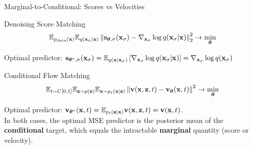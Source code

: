 \documentclass{beamer}
\begin{document}
\begin{frame}{Marginal-to-Conditional: Scores vs Velocities}
	\begin{block}{Denoising Score Matching}
		\vspace{-0.3cm}
		\[
			\mathbb{E}_{p_{\text{data}}(\mathbf{x})} \mathbb{E}_{q(\mathbf{x}_{\sigma} | \mathbf{x})}\left\| \mathbf{s}_{\boldsymbol{\theta}, \sigma}(\mathbf{x}_{\sigma}) - \nabla_{\mathbf{x}_{\sigma}} \log q(\mathbf{x}_{\sigma} | \mathbf{x}) \right\|_2^2 \rightarrow \min_{\boldsymbol{\theta}}
		\]
		\vspace{-0.3cm}
	\end{block}
	Optimal predictor: $\mathbf{s}_{\boldsymbol{\theta}^*, \sigma}(\mathbf{x}_\sigma) = \mathbb{E}_{q(\mathbf{x} | \mathbf{x}_\sigma)} \left[\nabla_{\mathbf{x}_\sigma} \log q(\mathbf{x}_\sigma | \mathbf{x}) \right] = \nabla_{\mathbf{x}_\sigma} \log q(\mathbf{x}_\sigma)$
	\eqpause
	\begin{block}{Conditional Flow Matching}
		\vspace{-0.3cm}
		\[
			\mathbb{E}_{t \sim U[0, 1]} \mathbb{E}_{\mathbf{z} \sim p(\mathbf{z})} \mathbb{E}_{\mathbf{x} \sim p_t(\mathbf{x} | \mathbf{z})}\left\| \mathbf{v}(\mathbf{x}, \mathbf{z}, t) - \mathbf{v}_{\boldsymbol{\theta}}(\mathbf{x}, t) \right\|^2 \rightarrow \min_{\boldsymbol{\theta}}
		\]
		\vspace{-0.3cm}
	\end{block}
	Optimal predictor: $\mathbf{v}_{\boldsymbol{\theta}^*}(\mathbf{x}, t) = \mathbb{E}_{p_t(\mathbf{z} | \mathbf{x})} \mathbf{v}(\mathbf{x}, \mathbf{z}, t) = \mathbf{v}(\mathbf{x}, t)$. \\
	\eqpause
	\vspace{0.2cm}
	In both cases, the optimal MSE predictor is the posterior mean of the \textbf{conditional} target, which equals the intractable \textbf{marginal} quantity (score or velocity).
\end{frame}
\end{document}
